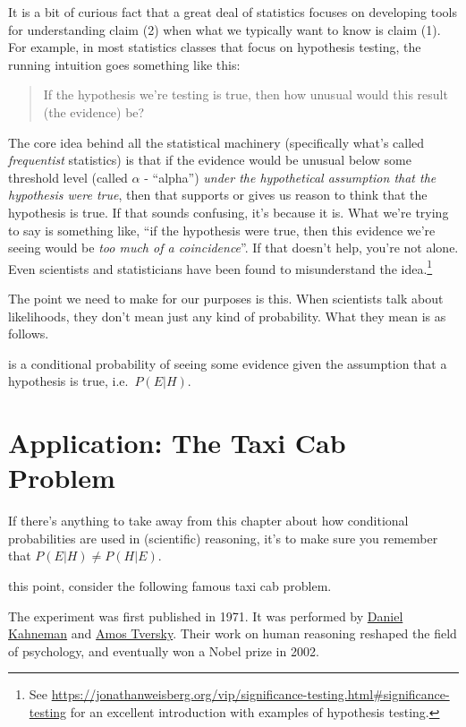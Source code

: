 \documentclass[]{tufte-book}
\begin{document}
It is a bit of curious fact that a great deal of statistics focuses on developing tools for understanding claim (2) when what we typically want to know is claim (1). For example, in most statistics classes that focus on hypothesis testing, the running intuition goes something like this:

\begin{quote}
If the hypothesis we're testing is true, then how unusual would this result (the evidence) be?
\end{quote}

The core idea behind all the statistical machinery (specifically what's called \emph{frequentist} statistics) is that if the evidence would be unusual below some threshold level (called \(\alpha\) - ``alpha'') \emph{under the hypothetical assumption that the hypothesis were true}, then that supports or gives us reason to think that the hypothesis is true. If that sounds confusing, it's because it is. What we're trying to say is something like, ``if the hypothesis were true, then this evidence we're seeing would be \emph{too much of a coincidence}''. If that doesn't help, you're not alone. Even scientists and statisticians have been found to misunderstand the idea.\footnote{See \url{https://jonathanweisberg.org/vip/significance-testing.html\#significance-testing} for an excellent introduction with examples of hypothesis testing.}

The point we need to make for our purposes is this. When scientists talk about likelihoods, they don't mean just any kind of probability. What they mean is as follows.

 is a conditional probability of seeing some evidence given the assumption that a hypothesis is true, i.e.~\(P(E|H)\).

\hypertarget{application-the-taxi-cab-problem}{%
\section{Application: The Taxi Cab Problem}\label{application-the-taxi-cab-problem}}

If there's anything to take away from this chapter about how conditional probabilities are used in (scientific) reasoning, it's to make sure you remember that \(P(E|H)\neq P(H|E)\).

 this point, consider the following famous taxi cab problem.

\begin{marginfigure}
The experiment was first published in 1971. It was performed by
\href{https://en.wikipedia.org/wiki/Daniel_Kahneman}{Daniel Kahneman}
and \href{https://en.wikipedia.org/wiki/Amos_Tversky}{Amos Tversky}.
Their work on human reasoning reshaped the field of psychology, and
eventually won a Nobel prize in 2002.
\end{marginfigure}
\end{document}
